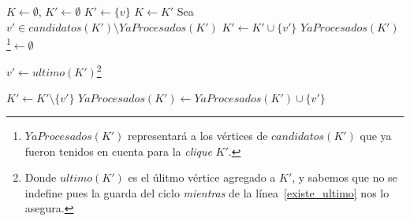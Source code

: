 \begin{algorithm}[H]
\begin{algorithmic}[1]
            \State $K \gets \emptyset$, $K' \gets \emptyset$
                \State $K' \gets \{v\}$
                \label{existe_ultimo}
                        \State $K \gets K'$
                        \State Sea $v' \in candidatos(K') \setminus YaProcesados(K')$
                        \State $K' \gets K' \cup \{v'\}$
                        \State $YaProcesados(K')$\footnote{$YaProcesados(K')$ representar\'a a
                            los v\'ertices de $candidatos(K')$ que ya fueron tenidos en cuenta
                            para la \emph{clique} $K'$.}$ \gets \emptyset$

                    \Else {}
                        \State $v' \gets ultimo(K')$\footnote{Donde $ultimo(K')$
                            es el \'ulitmo v\'ertice agregado a $K'$, y sabemos que no se
                            indefine pues la guarda del ciclo \emph{mientras} de la
                            l\'inea~\ref{existe_ultimo} nos lo asegura.}

                        \State $K' \gets K' \setminus \{v'\}$
                        \State $YaProcesados(K') \gets YaProcesados(K') \cup \{v'\}$

                    \EndIf

                \EndWhile

            \EndFor
        \EndIf

        \State {}
    \end{algorithmic}
\end{algorithm}
